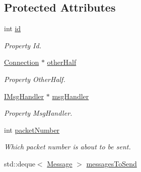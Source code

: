 \subsection*{Protected Attributes}
\begin{DoxyCompactItemize}
\item 
\hypertarget{classPseudoTcp_1_1Connection_a9baee02141ab1e3239f42c381816d70f}{
int \hyperlink{classPseudoTcp_1_1Connection_a9baee02141ab1e3239f42c381816d70f}{id}}
\label{classPseudoTcp_1_1Connection_a9baee02141ab1e3239f42c381816d70f}

\begin{DoxyCompactList}\small\item\em Property Id. \item\end{DoxyCompactList}\item 
\hypertarget{classPseudoTcp_1_1Connection_ac8324269b61373b2084ce2bd13cde979}{
\hyperlink{classPseudoTcp_1_1Connection}{Connection} $\ast$ \hyperlink{classPseudoTcp_1_1Connection_ac8324269b61373b2084ce2bd13cde979}{otherHalf}}
\label{classPseudoTcp_1_1Connection_ac8324269b61373b2084ce2bd13cde979}

\begin{DoxyCompactList}\small\item\em Property OtherHalf. \item\end{DoxyCompactList}\item 
\hypertarget{classPseudoTcp_1_1Connection_a48abbd96a00e8b85c2c6d57174956520}{
\hyperlink{classPseudoTcp_1_1IMsgHandler}{IMsgHandler} $\ast$ \hyperlink{classPseudoTcp_1_1Connection_a48abbd96a00e8b85c2c6d57174956520}{msgHandler}}
\label{classPseudoTcp_1_1Connection_a48abbd96a00e8b85c2c6d57174956520}

\begin{DoxyCompactList}\small\item\em Property MsgHandler. \item\end{DoxyCompactList}\item 
\hypertarget{classPseudoTcp_1_1Connection_a17349e4876f32fce12e2875cb2c6781a}{
int \hyperlink{classPseudoTcp_1_1Connection_a17349e4876f32fce12e2875cb2c6781a}{packetNumber}}
\label{classPseudoTcp_1_1Connection_a17349e4876f32fce12e2875cb2c6781a}

\begin{DoxyCompactList}\small\item\em Which packet number is about to be sent. \item\end{DoxyCompactList}\item 
\hypertarget{classPseudoTcp_1_1Connection_a53276de3f2fdbbf89de4cf10c85a0b4c}{
std::deque$<$ \hyperlink{classPseudoTcp_1_1Message}{Message} $>$ \hyperlink{classPseudoTcp_1_1Connection_a53276de3f2fdbbf89de4cf10c85a0b4c}{messagesToSend}}
\label{classPseudoTcp_1_1Connection_a53276de3f2fdbbf89de4cf10c85a0b4c}


\end{DoxyCompactItemize}
